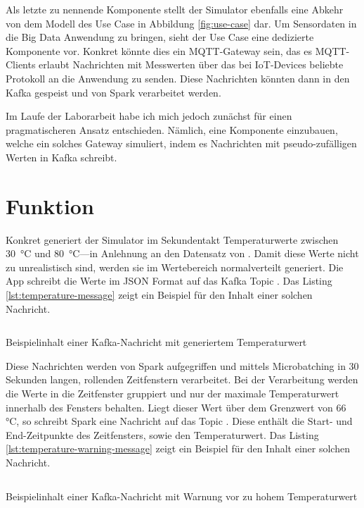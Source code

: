 Als letzte zu nennende Komponente stellt der Simulator ebenfalls eine Abkehr von dem Modell des Use Case in Abbildung \ref{fig:use-case} dar.
Um Sensordaten in die Big Data Anwendung zu bringen, sieht der Use Case eine dedizierte Komponente vor.
Konkret könnte dies ein MQTT-Gateway sein, das es MQTT-Clients erlaubt Nachrichten mit Messwerten über das bei IoT-Devices beliebte Protokoll an die Anwendung zu senden.
Diese Nachrichten könnten dann in den Kafka gespeist und von Spark verarbeitet werden.

Im Laufe der Laborarbeit habe ich mich jedoch zunächst für einen pragmatischeren Ansatz entschieden.
Nämlich, eine Komponente einzubauen, welche ein solches Gateway simuliert, indem es Nachrichten mit pseudo-zufälligen Werten in Kafka schreibt.

\section{Funktion}\label{sec:funktion}

Konkret generiert der Simulator im Sekundentakt Temperaturwerte zwischen 30~°C und 80~°C---in Anlehnung an den Datensatz von \cite{helwig_condition_2015}.
Damit diese Werte nicht zu unrealistisch sind, werden sie im Wertebereich normalverteilt generiert.
Die App schreibt die Werte im JSON Format auf das Kafka Topic .
Das Listing \ref{lst:temperature-message} zeigt ein Beispiel für den Inhalt einer solchen Nachricht.

\begin{listing}[H]
  \inputminted{json}{assets/src/temperature-message.json}
  \caption{Beispielinhalt einer Kafka-Nachricht mit generiertem Temperaturwert}\label{lst:temperature-message}
\end{listing}

Diese Nachrichten werden von Spark aufgegriffen und mittels Microbatching in 30 Sekunden langen, rollenden Zeitfenstern verarbeitet.
Bei der Verarbeitung werden die Werte in die Zeitfenster gruppiert und nur der maximale Temperaturwert innerhalb des Fensters behalten.
Liegt dieser Wert über dem Grenzwert von 66 °C, so schreibt Spark eine Nachricht auf das Topic .
Diese enthält die Start- und End-Zeitpunkte des Zeitfensters, sowie den Temperaturwert.
Das Listing \ref{lst:temperature-warning-message} zeigt ein Beispiel für den Inhalt einer solchen Nachricht.

\begin{listing}[H]
  \inputminted{json}{assets/src/temperature-warning-message.json}
  \caption{Beispielinhalt einer Kafka-Nachricht mit Warnung vor zu hohem Temperaturwert}\label{lst:temperature-warning-message}
\end{listing}


